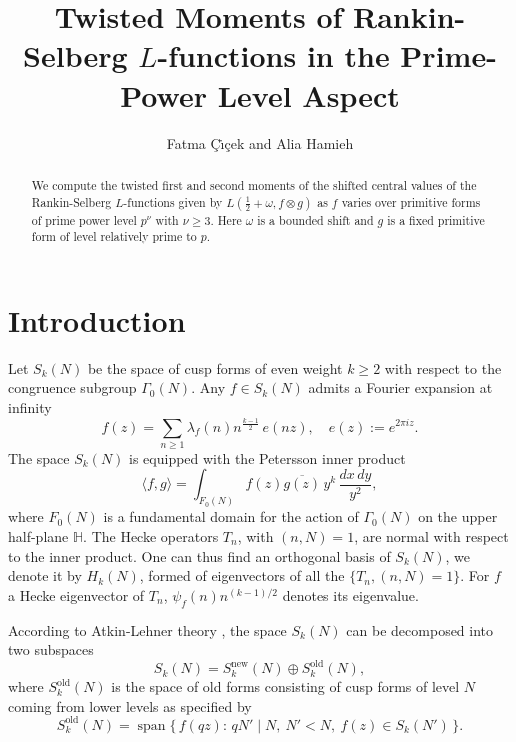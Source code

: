 \documentclass[12pt]{amsart}
\title[Rankin-Selberg $L$-functions in the prime-power level aspect]{Twisted Moments of Rankin-Selberg $L$-functions in the Prime-Power Level Aspect}
\author[F. \c{C}\.{\i}\c{c}ek and A. Hamieh]{Fatma \c{C}\.{\i}\c{c}ek and Alia Hamieh}
\theoremstyle{plain}
\theoremstyle{definition}
\begin{document}
\begin{abstract}
We compute the twisted first and second moments of the shifted central values of the Rankin-Selberg $L$-functions given by $L\left(\frac12+\omega, f\otimes g\right)$ as $f$ varies over primitive forms of prime power level $p^\nu$ with $\nu \geq 3$. Here $\omega$ is a bounded shift and $g$ is a fixed primitive form of level relatively prime to $p$. 

\end{abstract}
 



\maketitle



\section{Introduction}


Let $S_k(N)$ be the space of cusp forms of even weight $k\geq 2$ with respect to the congruence subgroup $\Gamma_0(N)$. Any $f\in S_k(N)$ admits a Fourier expansion at infinity
\begin{equation*}
f(z)=\sum_{n\ge 1} \lambda_f(n)n^{\frac{k-1}{2}}\,e(nz),\quad e(z):=e^{2\pi i z}.
\end{equation*}
The space $S_k(N)$ is equipped with the Petersson inner product
\begin{equation*}
\langle f,g\rangle = \int_{F_0(N)} f(z)\overline{g(z)}\,y^{k}\,\frac{dx\,dy}{y^{2}},
\end{equation*}
where $F_0(N)$ is a fundamental domain for the action of $\Gamma_0(N)$ on the upper half-plane $\mathbb{H}$. The Hecke operators $T_n$, with $(n,N)=1$, are normal with respect to the inner product. One can thus find an orthogonal basis of $S_k(N)$, we denote it by $H_k(N)$, formed of eigenvectors of all the $\{T_n,(n,N)=1\}.$ For $f$ a Hecke eigenvector of $T_n$, $\psi_f(n)n^{(k-1)/2}$
denotes its eigenvalue.

According to Atkin-Lehner theory \cite{Atkin-Lehner}, the space $S_k(N)$ can be decomposed
into two subspaces
\begin{equation*}
S_k(N)=S_k^{\mathrm{new}}(N) \oplus S_k^{\mathrm{old}}(N),
\end{equation*}
where $S_k^{\mathrm{old}}(N)$ is the space of old forms consisting of cusp forms of level $N$ coming from lower levels as specified by
\begin{equation*}
S_k^{\mathrm{old}}(N)=\operatorname{span}\bigl\{\, f(qz):\, qN'\mid N,\ N'<N,\ f(z)\in S_k(N')\,\bigr\}.
\end{equation*}
\end{document}

